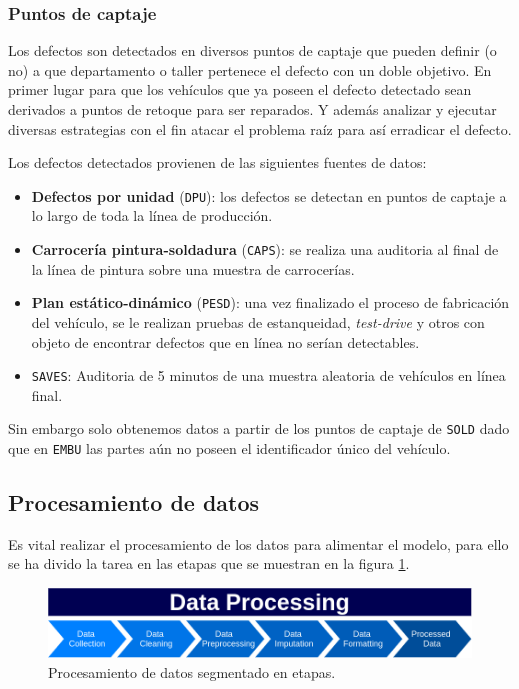 \documentclass[a4paper,12pt]{article}
\begin{document}
\subsubsection{Puntos de captaje} \label{ptocptj}
Los defectos son detectados en diversos puntos de captaje que pueden definir (o no) a que departamento o taller pertenece el defecto con un doble objetivo. En primer lugar para que los vehículos que ya poseen el defecto detectado sean derivados a puntos de retoque para ser reparados. Y además analizar y ejecutar diversas estrategias con el fin atacar el problema raíz para así erradicar el defecto.

Los defectos detectados provienen de las siguientes fuentes de datos:
\begin{itemize}
	\item \textbf{Defectos por unidad} (\texttt{DPU}): los defectos se detectan en puntos de captaje a lo largo de toda la línea de producción.
	\item \textbf{Carrocería pintura-soldadura} (\texttt{CAPS}): se realiza una auditoria al final de la línea de pintura sobre una muestra de carrocerías.
	\item \textbf{Plan estático-dinámico} (\texttt{PESD}): una vez finalizado el proceso de fabricación del vehículo, se le realizan pruebas de estanqueidad, \textit{test-drive} y otros con objeto de encontrar defectos que en línea no serían detectables.
	\item \texttt{SAVES}: Auditoria de 5 minutos de una muestra aleatoria de vehículos en línea final.
\end{itemize}

Sin embargo solo obtenemos datos a partir de los puntos de captaje de \texttt{SOLD} dado que en \texttt{EMBU} las partes aún no poseen el identificador único del vehículo.

\subsection{Procesamiento de datos}

Es vital realizar el procesamiento de los datos para alimentar el modelo, para ello se ha divido la tarea en las etapas que se muestran en la figura \ref{fig:dataproc}.

\begin{figure}[H]
	\begin{center}				
	\includegraphics[width=1\textwidth]{dataproc.png}
  	\caption{Procesamiento de datos segmentado en etapas.}
  	\label{fig:dataproc}
  	\end{center}
\end{figure}
\end{document}
